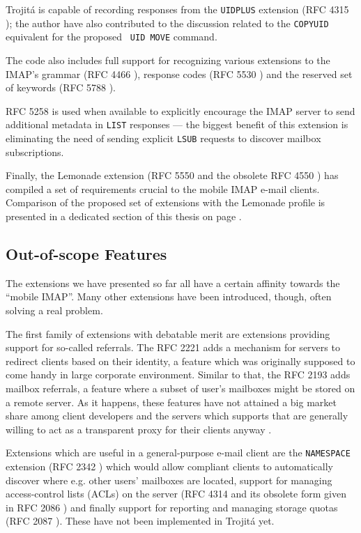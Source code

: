 \documentclass[trojita]{subfiles}
\begin{document}
Trojitá is capable of recording responses from the {\tt UIDPLUS} extension (RFC 4315 \cite{rfc4315}); the author have
also contributed \cite{jkt-move-uidplus} to the discussion related to the {\tt COPYUID} equivalent for the proposed {\tt
UID MOVE} command.

The code also includes full support for recognizing various extensions to the IMAP's grammar (RFC 4466 \cite{rfc4466}),
response codes (RFC 5530 \cite{rfc5530}) and the reserved set of keywords (RFC 5788 \cite{rfc5788}).

RFC 5258 \cite{rfc5258} is used when available to explicitly encourage the IMAP server to send additional metadata in
{\tt LIST} responses --- the biggest benefit of this extension is eliminating the need of sending explicit {\tt LSUB}
requests to discover mailbox subscriptions.

Finally, the Lemonade extension (RFC 5550 \cite{rfc5550} and the obsolete RFC 4550 \cite{rfc4550}) has compiled a set of
requirements crucial to the mobile IMAP e-mail clients.  Comparison of the proposed set of extensions with the Lemonade
profile is presented in a dedicated section of this thesis on page \pageref{sec:lemonade-comparison}.

\subsection{Out-of-scope Features}

The extensions we have presented so far all have a certain affinity towards the ``mobile IMAP''.  Many other extensions
have been introduced, though, often solving a real problem.

The first family of extensions with debatable merit are extensions providing support for so-called referrals.  The RFC
2221 \cite{rfc2221} adds a mechanism for servers to redirect clients based on their identity, a feature which was
originally supposed to come handy in large corporate environment.  Similar to that, the RFC 2193 \cite{rfc2193} adds
mailbox referrals, a feature where a subset of user's mailboxes might be stored on a remote server.  As it happens,
these features have not attained a big market share among client developers \cite{thunderbird-referrals} and the servers
which supports that are generally willing to act as a transparent proxy for their clients anyway
\cite{cyrus-referral-proxy}.

Extensions which are useful in a general-purpose e-mail client are the {\tt NAMESPACE} extension (RFC 2342
\cite{rfc2342}) which would allow compliant clients to automatically discover where e.g. other users' mailboxes are
located, support for managing access-control lists (ACLs) on the server (RFC 4314 \cite{rfc4314} and its obsolete form
given in RFC 2086 \cite{rfc2086}) and finally support for reporting and managing storage quotas (RFC 2087
\cite{rfc2087}).  These have not been implemented in Trojitá yet.
\end{document}
